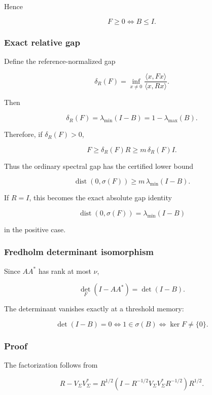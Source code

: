 Hence

\[
\boxed{
F\ge0
\iff
B\le I.
}
\]

\hypertarget{exact-relative-gap}{%
\subsubsection{Exact relative gap}\label{exact-relative-gap}}

Define the reference-normalized gap

\[
\delta_R(F)
=
\inf_{x\ne0}
\frac{\langle x,Fx\rangle}
     {\langle x,Rx\rangle}.
\]

Then

\[
\boxed{
\delta_R(F)
=
\lambda_{\min}(I-B)
=
1-\lambda_{\max}(B).
}
\]

Therefore, if \(\delta_R(F)>0\),

\[
F\ge \delta_R(F)R
\ge m\,\delta_R(F)I.
\]

Thus the ordinary spectral gap has the certified lower bound

\[
\boxed{
\operatorname{dist}(0,\sigma(F))
\ge
m\,\lambda_{\min}(I-B).
}
\]

If \(R=I\), this becomes the exact absolute gap identity

\[
\operatorname{dist}(0,\sigma(F))
=
\lambda_{\min}(I-B)
\]

in the positive case.

\hypertarget{fredholm-determinant-isomorphism}{%
\subsubsection{Fredholm determinant isomorphism}\label{fredholm-determinant-isomorphism}}

Since \(AA^*\) has rank at most \(\nu\),

\[
\boxed{
\det_{\!F}(I-AA^*)
=
\det(I-B).
}
\]

The determinant vanishes exactly at a threshold memory:

\[
\det(I-B)=0
\iff
1\in\sigma(B)
\iff
\ker F\ne\{0\}.
\]

\hypertarget{proof-1}{%
\subsubsection{Proof}\label{proof-1}}

The factorization follows from

\[
R-V_\Sigma V_\Sigma^*
=
R^{1/2}
\left(
I-R^{-1/2}V_\Sigma V_\Sigma^*R^{-1/2}
\right)
R^{1/2}.
\]


